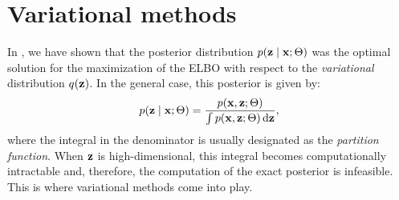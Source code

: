 \section{Variational methods}
\label{sec:variational_methods}

In , we have shown that the posterior distribution $p({\mathbf{z}} \mid {\mathbf{x}}; \Theta)$ was the optimal solution for the maximization of the ELBO with respect to the \emph{variational} distribution $q({\mathbf{z}})$. In the general case, this posterior is given by:
\begin{equation}
    p({\mathbf{z}} \mid {\mathbf{x}}; \Theta) = \frac{p({\mathbf{x}}, {\mathbf{z}}; \Theta)}{\int p({\mathbf{x}}, {\mathbf{z}}; \Theta) {\,\text{d}} {\mathbf{z}}},
\end{equation}
where the integral in the denominator is usually designated as the \emph{partition function}. When ${\mathbf{z}}$ is high-dimensional, this integral becomes computationally intractable and, therefore, the computation of the exact posterior is infeasible. This is where variational methods come into play.